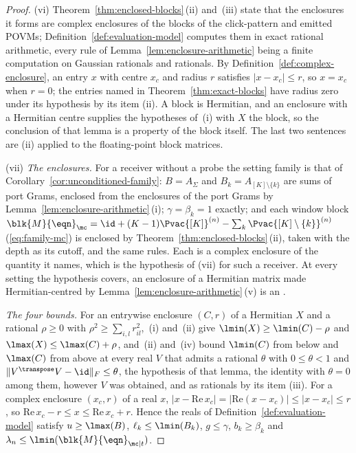 \begin{proof}
(vi) Theorem~\ref{thm:enclosed-blocks}\,(ii) and~(iii) state that the
enclosures it forms are complex enclosures of the blocks of the click-pattern
and emitted POVMs; Definition~\ref{def:evaluation-model} computes them in exact
rational arithmetic, every rule of Lemma~\ref{lem:enclosure-arithmetic} being
a finite computation on Gaussian rationals and rationals. By
Definition~\ref{def:complex-enclosure}, an entry $x$ with centre $x_c$ and
radius $r$ satisfies $\lvert x-x_c\rvert\le r$, so $x=x_c$ when $r=0$; the
entries named in Theorem~\ref{thm:exact-blocks} have radius zero under its
hypothesis by its item (ii). A block is Hermitian, and an enclosure with a
Hermitian centre supplies the hypotheses of
\,(i) with $X$ the block, so the
conclusion of that lemma is a property of the block itself. The last two
sentences are (ii) applied to the floating-point block matrices.

(vii) \emph{The enclosures.} For a receiver without a probe the setting family
is that of Corollary~\ref{cor:unconditioned-family}: $B=A_\Sigma$ and
$B_k=A_{[K]\setminus\{k\}}$ are sums of port Grams, enclosed from the
enclosures of the port Grams by Lemma~\ref{lem:enclosure-arithmetic}\,(i);
$\gamma=\beta_k=1$ exactly; and each window block
$\blk{M}{\eqn}_{\mc}=\id+(K-1)\Pvac{[K]}^{(n)}-\sum_k\Pvac{[K]\setminus\{k\}}^{(n)}$
(\eqref{eq:family-mc}) is enclosed by Theorem~\ref{thm:enclosed-blocks}\,(ii),
taken with the depth as its cutoff, and the same rules. Each is a complex
enclosure of the quantity it names, which is the hypothesis of (vii) for such
a receiver. At every setting the hypothesis covers, an enclosure of a
Hermitian matrix made Hermitian-centred by
Lemma~\ref{lem:enclosure-arithmetic}\,(v) is an .

\emph{The four bounds.} For an entrywise enclosure $(C,r)$ of a Hermitian $X$
and a rational $\rho\ge0$ with $\rho^{2}\ge\sum_{i,l}r_{il}^{2}$,
\,(i) and~(ii) give
$\lmin(X)\ge\lmin(C)-\rho$ and $\lmax(X)\le\lmax(C)+\rho$, and
\,(ii) and~(iv) bound
$\lmin(C)$ from below and $\lmax(C)$ from above at every real $V$ that
admits a rational $\theta$ with $0\le\theta<1$ and
$\lVert V^{\transpose}V-\id\rVert_{F}\le\theta$, the hypothesis of that lemma,
the identity with $\theta=0$ among them, however $V$ was obtained, and as
rationals by its item (iii). For a complex
enclosure $(x_c,r)$ of a real $x$,
$\lvert x-\mathrm{Re}\,x_c\rvert=\lvert\mathrm{Re}(x-x_c)\rvert\le\lvert
x-x_c\rvert\le r$, so $\mathrm{Re}\,x_c-r\le x\le\mathrm{Re}\,x_c+r$. Hence the
reals of Definition~\ref{def:evaluation-model} satisfy $u\ge\lmax(B)$,
$\ell_k\le\lmin(B_k)$, $g\le\gamma$, $b_k\ge\beta_k$ and
$\lambda_n\le\lmin(\blk{M}{\eqn}_{\mc|t})$.


\end{proof}
